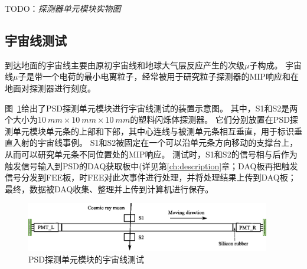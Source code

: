 TODO：\emph{探测器单元模块实物图}

\subsection{宇宙线测试}
\label{sec:dynamic_range:cosmic_ray}
到达地面的宇宙线主要由原初宇宙线和地球大气层反应产生的次级$\mu$子构成。
宇宙线$\mu$子是带一个电荷的最小电离粒子，经常被用于研究粒子探测器的MIP响应和在地面对探测器进行刻度。

图~\ref{fig:dynamic_range:cosmic_test}给出了PSD探测单元模块进行宇宙线测试的装置示意图。
其中，S1和S2是两个大小为$\SI{10}{mm} \times \SI{10}{mm} \times \SI{10}{mm}$的塑料闪烁体探测器。
它们分别放置在PSD探测单元模块单元条的上部和下部，其中心连线与被测单元条相互垂直，用于标识垂直入射的宇宙线事例。
S1和S2被固定在一个可以沿单元条方向移动的支撑台上，从而可以研究单元条不同位置处的MIP响应。
测试时，S1和S2的信号相与后作为触发信号输入到PSD的DAQ获取板中(详见第\ref{ch:description}章；DAQ板再把触发信号分发到FEE板，时FEE对此次事件进行处理，并将处理结果上传到DAQ板；最终，数据被DAQ收集、整理并上传到计算机进行保存。
\begin{figure}[htbp]
	\centering
	\includegraphics[width=0.95\textwidth]{chap/dynamic_range/fig/cosmic_test.eps}
	\caption{PSD探测单元模块的宇宙线测试}
	\label{fig:dynamic_range:cosmic_test}
\end{figure}

